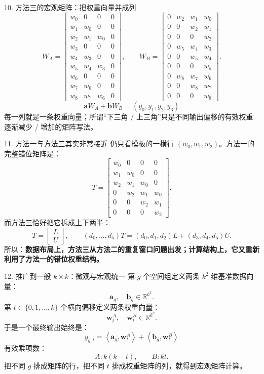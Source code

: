 \documentclass[aspectratio=169,11pt]{beamer}
\newcommand{\dotp}[2]{\left\langle #1,#2\right\rangle}
\newcommand{\R}{\mathbb{R}}
\begin{document}
\begin{frame}{10. 方法三的宏观矩阵：把权重向量并成列}
\scriptsize
\[
W_A=\begin{bmatrix}
 w_0&0&0&0\\
 w_1&w_0&0&0\\
 w_2&w_1&w_0&0\\
 w_3&0&0&0\\
 w_4&w_3&0&0\\
 w_5&w_4&w_3&0\\
 w_6&0&0&0\\
 w_7&w_6&0&0\\
 w_8&w_7&w_6&0
\end{bmatrix},\qquad
W_B=\begin{bmatrix}
 0&w_2&w_1&w_0\\
 0&0&w_2&w_1\\
 0&0&0&w_2\\
 0&w_5&w_4&w_3\\
 0&0&w_5&w_4\\
 0&0&0&w_5\\
 0&w_8&w_7&w_6\\
 0&0&w_8&w_7\\
 0&0&0&w_8
\end{bmatrix}.
\]
\[
\boxed{\bm a W_A+\bm b W_B=(y_0,y_1,y_2,y_3)}
\]
每一列就是一条权重向量；所谓“下三角 / 上三角”只是不同输出偏移的有效权重逐渐减少 / 增加的矩阵写法。
\end{frame}

\begin{frame}{11. 方法一与方法三其实非常接近}
\small
仍只看模板的一横行 \((w_0,w_1,w_2)\)。方法一的完整错位矩阵是：
\[
T=\begin{bmatrix}
 w_0&0&0&0\\
 w_1&w_0&0&0\\
 w_2&w_1&w_0&0\\
 0&w_2&w_1&w_0\\
 0&0&w_2&w_1\\
 0&0&0&w_2
\end{bmatrix}.
\]
而方法三恰好把它拆成上下两半：
\[
\boxed{T=\begin{bmatrix}L\\U\end{bmatrix}},\qquad
(d_0,\ldots,d_5)T=(d_0,d_1,d_2)L+(d_3,d_4,d_5)U.
\]
所以：\textbf{数据布局上，方法三从方法二的重复窗口问题出发；计算结构上，它又重新利用了方法一的错位权重结构。}
\end{frame}

\begin{frame}{12. 推广到一般 \(k\times k\)：微观与宏观统一}
\small
第 \(g\) 个空间组定义两条 \(k^2\) 维基准数据向量：
\[
\bm a_g,\quad \bm b_g\in\R^{k^2}.
\]
第 \(t\in\{0,1,\ldots,k\}\) 个横向偏移定义两条权重向量：
\[
\bm w_t^A,\quad \bm w_t^B\in\R^{k^2}.
\]
于是一个最终输出始终是：
\[
\boxed{y_{g,t}=\dotp{\bm a_g}{\bm w_t^A}+\dotp{\bm b_g}{\bm w_t^B}}
\]
有效乘项数：
\[
A:k(k-t),\qquad B:kt.
\]
把不同 \(g\) 排成矩阵的行，把不同 \(t\) 排成权重矩阵的列，就得到宏观矩阵计算。
\end{frame}
\end{document}
